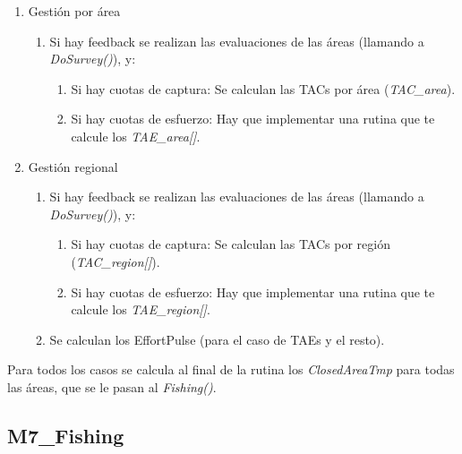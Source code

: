 \begin{enumerate}
						\item Gestión por área
							\begin{enumerate}
								\item Si hay feedback se realizan las evaluaciones de las áreas (llamando a \emph{DoSurvey()}), y:
								\begin{enumerate}
									\item Si hay cuotas de captura: Se calculan las TACs por área (\emph{TAC\_area}).
									\item Si hay cuotas de esfuerzo: Hay que implementar una rutina que te calcule los \emph{TAE\_area[]}.
								\end{enumerate}
							\end{enumerate}
						\item Gestión regional
							\begin{enumerate}
								\item Si hay feedback se realizan las evaluaciones de las áreas (llamando a \emph{DoSurvey()}), y:
								\begin{enumerate}
									\item Si hay cuotas de captura: Se calculan las TACs por región (\emph{TAC\_region[]}).
									\item Si hay cuotas de esfuerzo: Hay que implementar una rutina que te calcule los \emph{TAE\_region[]}.
								\end{enumerate}
								\item Se calculan los EffortPulse (para el caso de TAEs y el resto). 
							\end{enumerate}
					\end{enumerate}
			Para todos los casos se calcula al final de la rutina los \emph{ClosedAreaTmp} para todas las áreas, que se le pasan al \emph{Fishing()}.
				
		\subsection{M7\_Fishing}
